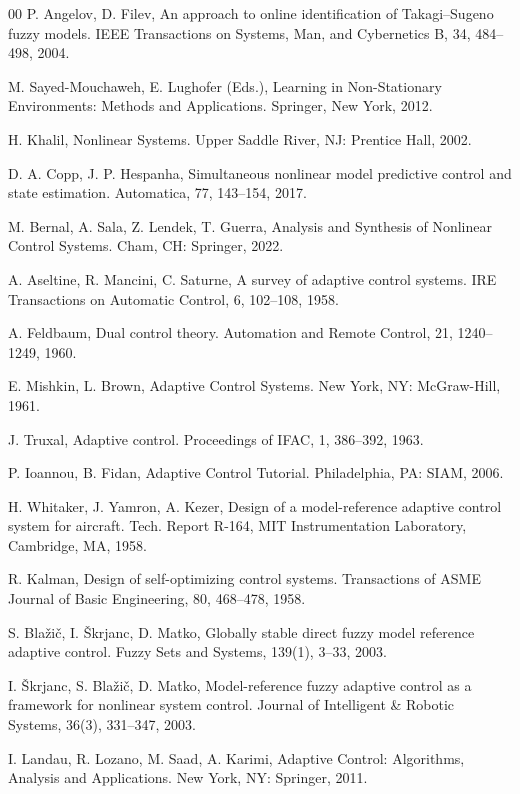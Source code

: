 \documentclass[conference]{IEEEtran}
\begin{document}
\begin{thebibliography}{00}
 P. Angelov, D. Filev, An approach to online identification of Takagi–Sugeno fuzzy models. IEEE Transactions on Systems, Man, and Cybernetics B, 34, 484–498, 2004.

 M. Sayed-Mouchaweh, E. Lughofer (Eds.), Learning in Non-Stationary Environments: Methods and Applications. Springer, New York, 2012.

 H. Khalil, Nonlinear Systems. Upper Saddle River, NJ: Prentice Hall, 2002.

 D. A. Copp, J. P. Hespanha, Simultaneous nonlinear model predictive control and state estimation. Automatica, 77, 143–154, 2017.

 M. Bernal, A. Sala, Z. Lendek, T. Guerra, Analysis and Synthesis of Nonlinear Control Systems. Cham, CH: Springer, 2022.

 A. Aseltine, R. Mancini, C. Saturne, A survey of adaptive control systems. IRE Transactions on Automatic Control, 6, 102–108, 1958.

 A. Feldbaum, Dual control theory. Automation and Remote Control, 21, 1240–1249, 1960.

 E. Mishkin, L. Brown, Adaptive Control Systems. New York, NY: McGraw-Hill, 1961.

 J. Truxal, Adaptive control. Proceedings of IFAC, 1, 386–392, 1963.

 P. Ioannou, B. Fidan, Adaptive Control Tutorial. Philadelphia, PA: SIAM, 2006.

 H. Whitaker, J. Yamron, A. Kezer, Design of a model-reference adaptive control system for aircraft. Tech. Report R-164, MIT Instrumentation Laboratory, Cambridge, MA, 1958.

 R. Kalman, Design of self-optimizing control systems. Transactions of ASME Journal of Basic Engineering, 80, 468–478, 1958.

 S. Blažič, I. Škrjanc, D. Matko, Globally stable direct fuzzy model reference adaptive control. Fuzzy Sets and Systems, 139(1), 3–33, 2003.

 I. Škrjanc, S. Blažič, D. Matko, Model-reference fuzzy adaptive control as a framework for nonlinear system control. Journal of Intelligent \& Robotic Systems, 36(3), 331–347, 2003.

 I. Landau, R. Lozano, M. Saad, A. Karimi, Adaptive Control: Algorithms, Analysis and Applications. New York, NY: Springer, 2011.


\end{thebibliography}
\end{document}
